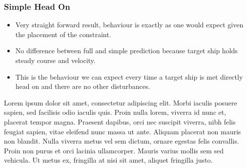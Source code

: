 

\subsubsection{Simple Head On}
\begin{itemize}
    \item Very straight forward result, behaviour is exactly as one would expect given the placement of the constraint.
    \item No difference between full and simple prediction because target ship holds steady course and velocity.
    \item This is the behaviour we can expect every time a target ship is met directly head on and there are no other disturbances.
\end{itemize}
Lorem ipsum dolor sit amet, consectetur adipiscing elit. Morbi iaculis posuere sapien, sed facilisis odio iaculis quis. 
Proin nulla lorem, viverra id nunc et, placerat tempor magna. Praesent dapibus, orci nec suscipit viverra, nibh felis feugiat sapien, 
vitae eleifend nunc massa ut ante. Aliquam placerat non mauris non blandit. Nulla viverra metus vel sem dictum, ornare egestas felis convallis. 
Proin non purus et orci lacinia ullamcorper. Mauris varius mollis sem sed vehicula. Ut metus ex, fringilla at nisi sit amet, aliquet fringilla justo.
